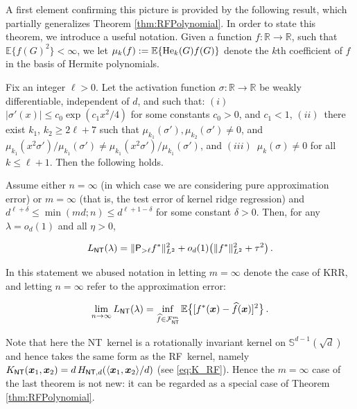 A first element confirming this picture is provided by the following result, which partially generalizes Theorem \ref{thm:RFPolynomial}. In order to state this theorem, we introduce a useful notation. Given a function $f:{\mathbb R}\to{\mathbb R}$, such that $\mathbb{E}\{f(G)^2\}<\infty$, we let $\mu_k(f):=\mathbb{E}\{{\rm He}_k(G)f(G)\}$ denote the $k$th coefficient of $f$ in the basis of Hermite polynomials.

\begin{theorem}\label{thm:NTPolynomial}
  Fix an integer $\ell>0$. Let the activation function $\sigma:{\mathbb R}\to{\mathbb R}$ be weakly differentiable, independent of $d$, and such that:
  $(i)$~$|\sigma'(x)|\le c_0\exp(c_1x^2/4)$ for some constants $c_0>0$, and $c_1<1$, $(ii)$~there exist $k_1$, $k_2\ge 2\ell+7$ such that $\mu_{k_1}(\sigma'),\mu_{k_2}(\sigma')\neq 0$, and $\mu_{k_1}(x^2\sigma')/\mu_{k_1}(\sigma') \neq \mu_{k_1}(x^2\sigma')/\mu_{k_1}(\sigma')$, and $(iii)$~$\mu_k(\sigma)\neq 0$ for all $k\le \ell+1$. Then the following holds.

  Assume either  $n=\infty$ (in which case we are considering pure approximation error) or $m=\infty$
(that is, the test error of kernel ridge regression)  and
$d^{\ell+\delta}\le \min(md;n) \le d^{\ell+1-\delta}$ for some constant $\delta>0$. Then, for any $\lambda = o_d(1)$ and all $\eta>0$,

  \begin{align}
    {L}_{{\sf NT}}(\lambda) = \|{\mathsf P}_{>\ell} f^*\|_{L^2}^2 +o_d(1) \big(\| f^*\|_{L^2}^2+\tau^2\big)\, .
  \end{align}
\end{theorem}

In this statement we  abused notation in letting $m=\infty$ denote the case of KRR, and letting $n=\infty$  refer to the approximation error:

  \begin{align}
\lim_{n\to\infty}    {L}_{{\sf NT}}(\lambda) = \inf_{{\widehat f}\in {\mathcal F}_{{\sf NT}}^m}\mathbb{E}\big\{[f^*({\boldsymbol x})-{\widehat f}({\boldsymbol x})]^2\big\}\, .
  \end{align}

  Note that here the {\sf NT}\, kernel is a rotationally invariant kernel on $\mathbb{S}^{d-1}(\sqrt{d})$ and hence takes the same form as the {\sf RF}\, kernel,  namely $K_{{\sf NT}}({\boldsymbol x}_1,{\boldsymbol x}_2) = d\, H_{{\sf NT},d}(\langle{\boldsymbol x}_1,{\boldsymbol x}_2\rangle/d)$
  (see \eqref{eq:K_RF}). Hence the $m=\infty$ case of the last theorem is not new: it can be regarded as a special case of Theorem
  \ref{thm:RFPolynomial}.

